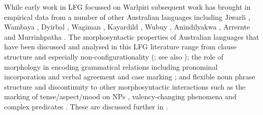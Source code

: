 \documentclass[output=paper,hidelinks]{langscibook}
\begin{document}
\begin{sloppypar}
While early work in LFG focussed on Warlpiri \citep{Simpson1983,SimpBres1983,Simpson1991} subsequent work has brought in empirical data from a number of other Australian languages including Jiwarli \citep{AustBres96}, Wambaya \citep{NordBres1996,nordlinger1998constructive}, Dyirbal \citep{Manning1996}, Wagiman \citep{Wilson1999}, Kayardild \citep{EvanNord2004}, Wubuy \citep{BakeNord2008,Bakeretal2010}, Anindilyakwa \citep{Egmond2008}, Arrernte \citep{Drasetal2012} and Murrinhpatha \citep{SeisNord2010,Seiss2013}. The morphosyntactic properties of Australian languages that have been discussed and analysed in this LFG literature range from clause structure and especially non-configurationality (\citealt{Simpson1991,AustBres96,NordBres2011,Snijders2015}; see also ); the role of morphology in encoding grammatical relations \citep{NordBres2011,nordlinger1998constructive} including pronominal incorporation and verbal agreement \citep{AustBres96} and case marking \citep{Simpson1991,Andrews1996,nordlinger1998constructive,Andrews2017}; and flexible noun phrase structure and discontinuity \citep{Simpson1991,SadlNord_apposition_2006,SadlNord2010,snijders_lfg_2016} to other morphosyntactic interactions such as the marking of tense{\slash}aspect{\slash}mood on NPs \citep{NordSadlLanguage}, valency-changing phenomena \citep{Austin97,SeisNord2010} and complex predicates \citep{Wilson1999,AndrewsManning1999}.  These are discussed further in .
\end{sloppypar}
\end{document}
